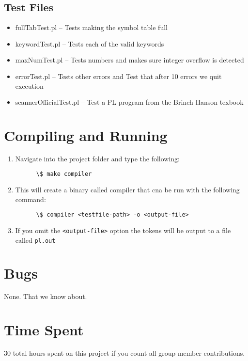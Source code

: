 \documentclass{article}
\begin{document}
\subsection{Test Files}
\begin{itemize}
	\item fullTabTest.pl – Tests making the symbol table full
	\item keywordTest.pl – Tests each of the valid keywords
	\item maxNumTest.pl – Tests numbers and makes sure integer overflow is detected
	\item errorTest.pl – Tests other errors and Test that after 10 errors we quit execution
	\item scannerOfficialTest.pl – Test a PL program from the Brinch Hanson texbook
\end{itemize}

\section{Compiling and Running}
\begin{enumerate}
	\item Navigate into the project folder and type the following:

\verb|		\$ make compiler|

	\item This will create a binary called compiler that cna be run with the following command:

\verb|		\$ compiler <testfile-path> -o <output-file>|

	\item If you omit the \verb|<output-file>| option the tokens will be output to a file called \verb|pl.out|
\end{enumerate}

\section{Bugs}
None. That we know about.


\section{Time Spent}
30 total hours spent on this project if you count all group member contributions.
\end{document}
